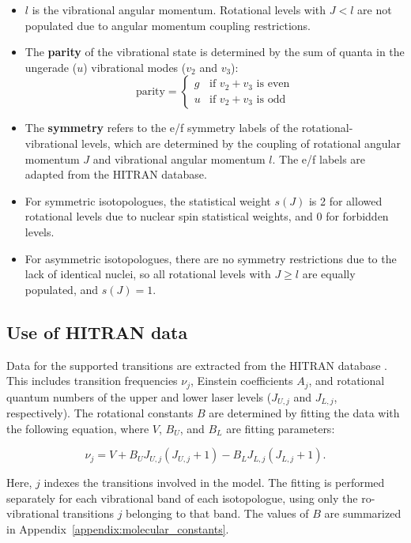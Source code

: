 \documentclass{report}
\begin{document}
\begin{itemize}
    \item \(l\) is the vibrational angular momentum. Rotational levels with \( J < l \) are not populated due to angular momentum coupling restrictions.
    \item The \textbf{parity} of the vibrational state is determined by the sum of quanta in the ungerade (\( u \)) vibrational modes (\( v_2 \) and \( v_3 \)):
    \[
    \text{parity} = \begin{cases}
    g & \text{if } v_2 + v_3 \text{ is even} \\
    u & \text{if } v_2 + v_3 \text{ is odd}
    \end{cases}
    \]
    \item The \textbf{symmetry} refers to the e/f symmetry labels of the rotational-vibrational levels, which are determined by the coupling of rotational angular momentum \( J \) and vibrational angular momentum \( l \). The e/f labels are adapted from the HITRAN database.
    \item For symmetric isotopologues, the statistical weight \( s(J) \) is 2 for allowed rotational levels due to nuclear spin statistical weights, and 0 for forbidden levels.
    \item For asymmetric isotopologues, there are no symmetry restrictions due to the lack of identical nuclei, so all rotational levels with \( J \geq l \) are equally populated, and \( s(J) = 1 \).
\end{itemize}



\subsection{Use of HITRAN data}

Data for the supported transitions are extracted from the HITRAN database \cite{Gordon-2022}. This includes transition frequencies $\nu_j$, Einstein coefficients $A_j$, and rotational quantum numbers of the upper and lower laser levels ($J_{U,j}$ and $J_{L,j}$, respectively). The rotational constants $B$ are determined by fitting the data with the following equation, where $V$, $B_U$, and $B_L$ are fitting parameters:

\begin{equation}\label{eq:frequencies}
\nu_j = V + B_U J_{U,j} (J_{U,j} + 1) - B_L J_{L,j} (J_{L,j} + 1).
\end{equation}

Here, $j$ indexes the transitions involved in the model. The fitting is performed separately for each vibrational band of each isotopologue, using only the ro-vibrational transitions $j$ belonging to that band. The values of $B$ are summarized in Appendix~\ref{appendix:molecular_constants}.
\end{document}
